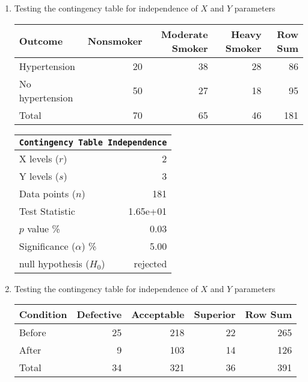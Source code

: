 \begin{enumerate}
\begin{table}[H]
	\end{table}
	\bigskip
	
	\item Testing the contingency table for independence of $ X $ and $ Y $ parameters
	
	\begin{table}[H]
		\centering
		\begin{tabular}{lrrrr}
			\toprule
			Outcome &  Nonsmoker &  Moderate Smoker &  Heavy Smoker &  Row Sum \\
			\midrule
			Hypertension    &         20 &               38 &            28 &       86 \\
			No hypertension &         50 &               27 &            18 &       95 \\
			\midrule
			Total           &         70 &               65 &            46 &      181 \\
			\bottomrule
		\end{tabular}
		
	\end{table}
	\bigskip
	\begin{table}[H]
		\centering
		\begin{tabular}{@{}lr@{}}
			\toprule
			\multicolumn{2}{c}{\texttt{Contingency Table Independence}} \\
			\midrule
			X levels ($r$)             &         2 \\
			Y levels ($s$)             &         3 \\
			Data points ($n$)          &       181 \\
			Test Statistic             &  1.65e+01 \\
			$p$ value \%               &      0.03 \\
			Significance ($\alpha$) \% &      5.00 \\
			null hypothesis ($H_0$)    &  rejected \\
			\bottomrule
		\end{tabular}
		
	\end{table}
	\bigskip
	
	\item Testing the contingency table for independence of $ X $ and $ Y $ parameters
	
	\begin{table}[H]
		\centering
		\begin{tabular}{lrrrr}
			\toprule
			Condition &   Defective &   Acceptable &   Superior &  Row Sum \\
			\midrule
			Before    &          25 &          218 &         22 &      265 \\
			After     &           9 &          103 &         14 &      126 \\
			\midrule
			Total     &          34 &          321 &         36 &      391 \\
			\bottomrule
		\end{tabular}
		

\end{table}
\end{enumerate}
